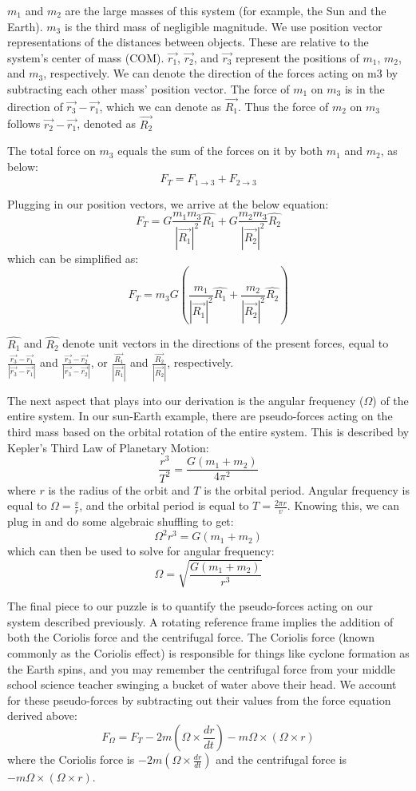$m_1$ and $m_2$ are the large masses of this system (for example, the Sun and the Earth). $m_3$ is the third mass of negligible magnitude. We use position vector representations of the distances between objects. These are relative to the system’s center of mass (COM). $\vec{r_1}$, $\vec{r_2}$, and $\vec{r_3}$ represent the positions of $m_1$, $m_2$, and $m_3$, respectively. We can denote the direction of the forces acting on m3 by subtracting each other mass’ position vector. The force of $m_1$ on $m_3$ is in the direction of $\vec{r_3}-\vec{r_1}$, which we can denote as $\vec{R_1}$. Thus the force of $m_2$ on $m_3$ follows $\vec{r_2}-\vec{r_1}$, denoted as $\vec{R_2}$

The total force on $m_3$ equals the sum of the forces on it by both $m_1$ and $m_2$, as below: 
\[F_T=F_{1\rightarrow3} + F_{2\rightarrow3}\]

Plugging in our position vectors, we arrive at the below equation:
\[F_T=G\frac{m_1m_3}{|\vec{R_1}|^2}\hat{R_1}+G\frac{m_2m_3}{|\vec{R_2}|^2}\hat{R_2}\]
which can be simplified as:
\[F_T=m_3G(\frac{m_1}{|\vec{R_1}|^2}\hat{R_1}+\frac{m_2}{|\vec{R_2}|^2}\hat{R_2})\]

$\hat{R_1}$ and $\hat{R_2}$ denote unit vectors in the directions of the present forces, equal to $\frac{\vec{r_3}-\vec{r_1}}{|\vec{r_3}-\vec{r_1}|}$ and $\frac{\vec{r_3}-\vec{r_2}}{|\vec{r_3}-\vec{r_2}|}$, or $\frac{\vec{R_1}}{|\vec{R_1}|}$ and $\frac{\vec{R_2}}{|\vec{R_2}|}$, respectively. 

The next aspect that plays into our derivation is the angular frequency ($\Omega$) of the entire system. In our sun-Earth example, there are pseudo-forces acting on the third mass based on the orbital rotation of the entire system. This is described by Kepler’s Third Law of Planetary Motion:
\[\frac{r^3}{T^2}=\frac{G(m_1+m_2)}{4\pi^2}\]
where $r$ is the radius of the orbit and $T$ is the orbital period. Angular frequency is equal to $\Omega=\frac{v}{r}$, and the orbital period is equal to $T=\frac{2\pi r}{v}$. Knowing this, we can plug in and do some algebraic shuffling to get:
\[\Omega^2r^3=G(m_1+m_2)\]
which can then be used to solve for angular frequency:
\[\Omega=\sqrt{\frac{G(m_1+m_2)}{r^3}}\]

The final piece to our puzzle is to quantify the pseudo-forces acting on our system described previously. A rotating reference frame implies the addition of both the Coriolis force and the centrifugal force. The Coriolis force (known commonly as the Coriolis effect) is responsible for things like cyclone formation as the Earth spins, and you may remember the centrifugal force from your middle school science teacher swinging a bucket of water above their head. We account for these pseudo-forces by subtracting out their values from the force equation derived above:
\[F_{\Omega}=F_T-2m(\Omega\times\frac{dr}{dt})-m\Omega\times(\Omega\times r)\]
where the Coriolis force is $-2m(\Omega\times\frac{dr}{dt})$ and the centrifugal force is $-m\Omega\times(\Omega\times r)$.

